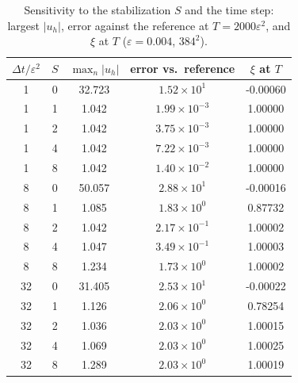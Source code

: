 \documentclass[11pt]{article}
\begin{document}
\begin{table}[htbp]\centering\small
\caption{Sensitivity to the stabilization $S$ and the time step: largest $|u_h|$, error against the reference at $T=2000\varepsilon^2$, and $\xi$ at $T$ ($\varepsilon=0.004$, $384^2$).}
\begin{tabular}{cc ccc}
\toprule
$\Delta t/\varepsilon^2$ & $S$ & $\max_n|u_h|$ & error vs.\ reference & $\xi$ at $T$\\
\midrule
1 & 0 & 32.723 & $1.52{\times}10^{1}$ & -0.00060\\
1 & 1 & 1.042 & $1.99{\times}10^{-3}$ & 1.00000\\
1 & 2 & 1.042 & $3.75{\times}10^{-3}$ & 1.00000\\
1 & 4 & 1.042 & $7.22{\times}10^{-3}$ & 1.00000\\
1 & 8 & 1.042 & $1.40{\times}10^{-2}$ & 1.00000\\
8 & 0 & 50.057 & $2.88{\times}10^{1}$ & -0.00016\\
8 & 1 & 1.085 & $1.83{\times}10^{0}$ & 0.87732\\
8 & 2 & 1.042 & $2.17{\times}10^{-1}$ & 1.00002\\
8 & 4 & 1.047 & $3.49{\times}10^{-1}$ & 1.00003\\
8 & 8 & 1.234 & $1.73{\times}10^{0}$ & 1.00002\\
32 & 0 & 31.405 & $2.53{\times}10^{1}$ & -0.00022\\
32 & 1 & 1.126 & $2.06{\times}10^{0}$ & 0.78254\\
32 & 2 & 1.036 & $2.03{\times}10^{0}$ & 1.00015\\
32 & 4 & 1.069 & $2.03{\times}10^{0}$ & 1.00025\\
32 & 8 & 1.289 & $2.03{\times}10^{0}$ & 1.00019\\
\bottomrule
\end{tabular}
\end{table}
\end{document}
